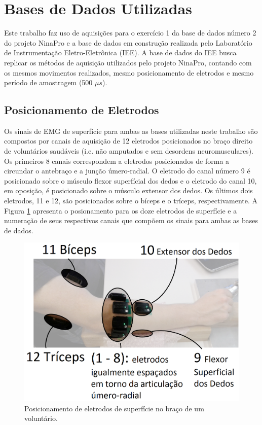 		\section{Bases de Dados Utilizadas}
Este trabalho faz uso de aquisições para o exercício 1 da base de dados número 2 do projeto NinaPro \cite{Gijsberts2014} e a base de dados em construção realizada pelo Laboratório de Instrumentação Eletro-Eletrônica (IEE). A base de dados do IEE busca replicar os métodos de aquisição utilizados pelo projeto NinaPro, contando com os mesmos movimentos realizados, mesmo posicionamento de eletrodos e mesmo período de amostragem (500 $\mu s$).

			\subsection{Posicionamento de Eletrodos}
Os sinais de EMG de superfície para ambas as bases utilizadas neste trabalho são compostos por canais de aquisição de 12 eletrodos posicionados no braço direito de voluntários saudáveis (i.e. não amputados e sem desordens neuromusculares). Os primeiros 8 canais correspondem a eletrodos posicionados de forma a circundar o antebraço e a junção úmero-radial. O eletrodo do canal número 9 é posicionado sobre o músculo flexor superfícial dos dedos e o eletrodo do canal 10, em oposição, é posicionado sobre o músculo extensor dos dedos. Os últimos dois eletrodos, 11 e 12, são posicionados sobre o bíceps e o tríceps, respectivamente. A Figura \ref{fig:eletrodos} apresenta o posionamento para os doze eletrodos de superfície e a numeração de seus respectivos canais que compõem os sinais para ambas as bases de dados.

\begin{figure}[htb]
	\caption{\label{fig:eletrodos}Posicionamento de eletrodos de superfície no braço de um voluntário.}
	\begin{center}
	    \includegraphics[width=0.75\linewidth]{./img/eletrodos.png}
	\end{center}
\end{figure}

